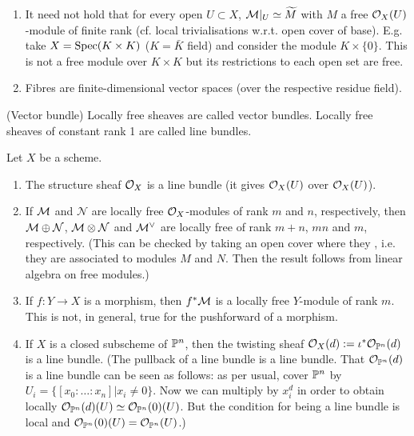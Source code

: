 \documentclass[a4paper,11pt]{article}
\begin{document}
			\begin{remark}
				\begin{enumerate}
					\item It need not hold that for every open $U\subset X$, $\M|_U\simeq\widetilde{M}$ with $M$ a free $\O_X(U)$-module of finite rank (cf. local trivialisations w.r.t. open cover of base). E.g. take $X=\spec(K\times K)$ ($K=\bar{K}$ field) and consider the module $K\times\{0\}$. This is not a free module over $K\times K$ but its restrictions to each open set are free.
					\item Fibres are finite-dimensional vector spaces (over the respective residue field).  
				\end{enumerate}
			\end{remark}

			\begin{defi}
				(Vector bundle) Locally free sheaves are called vector bundles. Locally free sheaves of constant rank 1 are called line bundles.
			\end{defi}

			\begin{eg}
				Let $X$ be a scheme.
				\begin{enumerate}
					\item The structure sheaf $\O_X$ is a line bundle (it gives $\O_X(U)$ over $\O_X(U)$).
					\item If $\M$ and $\mathcal{N}$ are locally free $\O_X$-modules of rank $m$ and $n$, respectively, then $\M\oplus\mathcal{N}$, $\M\otimes\mathcal{N}$ and $\M^\vee$ are locally free of rank $m+n$, $mn$ and $m$, respectively. (This can be checked by taking an open cover where they , i.e. they are associated to modules $M$ and $N$. Then the result follows from linear algebra on free modules.)
					\item If $f:Y\rightarrow X$ is a morphism, then $f^\ast\M$ is a locally free $Y$-module of rank $m$. This is not, in general, true for the pushforward of a morphism.
					\item If $X$ is a closed subscheme of $\P^n$, then the twisting sheaf $\O_X(d):=\iota^\ast\O_{\P^n}(d)$ is a line bundle. (The pullback of a line bundle is a line bundle. That $\O_{\P^n}(d)$ is a line bundle can be seen as follows: as per usual, cover $\P^n$ by $U_i=\{[x_0:\ldots:x_n]|x_i\neq0\}$. Now we can multiply by $x_i^d$ in order to obtain locally $\O_{\P^n}(d)(U)\simeq\O_{\P^n}(0)(U)$. But the condition for being a line bundle is local and $\O_{\P^n}(0)(U)=\O_{\P^n}(U)$.)
				\end{enumerate}
			\end{eg}
\end{document}
